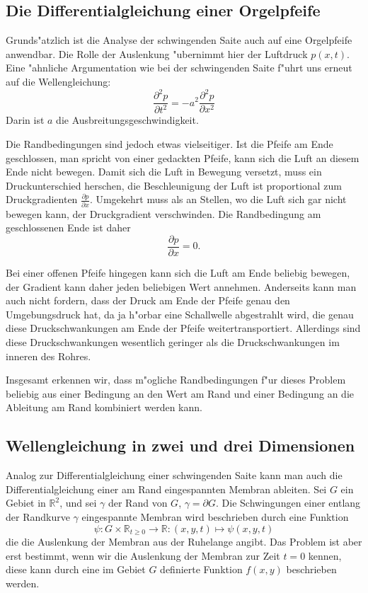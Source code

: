 \subsection{Die Differentialgleichung einer Orgelpfeife}
Grunds"atzlich ist die Analyse der schwingenden Saite auch auf
eine Orgelpfeife anwendbar. Die Rolle der Auslenkung "ubernimmt
hier der Luftdruck $p(x,t)$. Eine "ahnliche Argumentation wie bei
der schwingenden Saite f"uhrt uns erneut auf die Wellengleichung:
\[
\frac{\partial^2p}{\partial t^2}=
-a^2\frac{\partial^2p}{\partial x^2}
\]
Darin ist $a$ die Ausbreitungsgeschwindigkeit.

Die Randbedingungen sind jedoch etwas vielseitiger.
Ist die Pfeife am Ende geschlossen, man spricht von
einer gedackten Pfeife, kann sich die Luft an diesem Ende nicht bewegen.
Damit sich die Luft in Bewegung versetzt, muss ein Druckunterschied herschen,
die Beschleunigung der Luft ist proportional zum Druckgradienten
$\frac{\partial p}{\partial x}$. Umgekehrt muss als an Stellen, wo die
Luft sich gar nicht bewegen kann, der Druckgradient verschwinden.
Die Randbedingung am geschlossenen Ende ist daher
\[
\frac{\partial p}{\partial x}=0.
\]

Bei einer offenen Pfeife hingegen kann sich die Luft am Ende beliebig
bewegen, der Gradient kann daher jeden beliebigen Wert annehmen.
Anderseits kann man auch nicht fordern, dass der Druck am
Ende der Pfeife genau den Umgebungsdruck hat, da ja h"orbar eine
Schallwelle abgestrahlt wird, die genau diese Druckschwankungen am
Ende der Pfeife weitertransportiert. Allerdings sind diese Druckschwankungen
wesentlich geringer als die Druckschwankungen im inneren des Rohres.

Insgesamt erkennen wir, dass m"ogliche Randbedingungen f"ur dieses Problem
beliebig aus einer Bedingung an den Wert am Rand und einer Bedingung
an die Ableitung am Rand kombiniert werden kann.

\subsection{Wellengleichung in zwei und drei Dimensionen}
Analog zur Differentialgleichung einer schwingenden Saite kann
man auch die Differentialgleichung einer am Rand eingespannten Membran
ableiten.
Sei $G$ ein Gebiet in $\mathbb R^2$, und sei $\gamma$ der Rand
von $G$, $\gamma = \partial G$. Die Schwingungen einer entlang der Randkurve
$\gamma$ eingespannte Membran wird beschrieben durch eine Funktion
\[
\psi\colon G\times \mathbb R_{t \ge 0}\to\mathbb R\colon (x,y,t)\mapsto \psi(x,y,t)
\]
die die Auslenkung der Membran aus der Ruhelange angibt. Das Problem ist aber
erst bestimmt, wenn wir die Auslenkung der Membran zur Zeit $t=0$ kennen,
diese kann durch eine im Gebiet $G$ definierte Funktion $f(x,y)$ beschrieben
werden.

